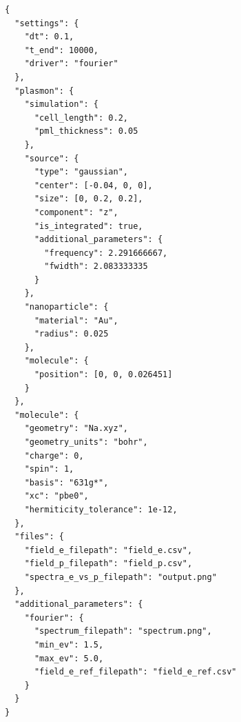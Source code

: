 \documentclass[11pt,a4paper]{article}
\begin{document}
\begin{lstlisting}[language={}]
{
  "settings": {
    "dt": 0.1,
    "t_end": 10000,
    "driver": "fourier"
  },
  "plasmon": {
    "simulation": {
      "cell_length": 0.2,
      "pml_thickness": 0.05
    },
    "source": {
      "type": "gaussian",
      "center": [-0.04, 0, 0],
      "size": [0, 0.2, 0.2],
      "component": "z",
      "is_integrated": true,
      "additional_parameters": {
        "frequency": 2.291666667,
        "fwidth": 2.083333335
      }
    },
    "nanoparticle": {
      "material": "Au",
      "radius": 0.025
    },
    "molecule": {
      "position": [0, 0, 0.026451]
    }
  },
  "molecule": {
    "geometry": "Na.xyz",
    "geometry_units": "bohr",
    "charge": 0,
    "spin": 1,
    "basis": "631g*",
    "xc": "pbe0",
    "hermiticity_tolerance": 1e-12,
  },
  "files": {
    "field_e_filepath": "field_e.csv",
    "field_p_filepath": "field_p.csv",
    "spectra_e_vs_p_filepath": "output.png"
  },
  "additional_parameters": {
    "fourier": {
      "spectrum_filepath": "spectrum.png",
      "min_ev": 1.5,
      "max_ev": 5.0,
      "field_e_ref_filepath": "field_e_ref.csv"
    }
  }
}
\end{lstlisting}
\end{document}
